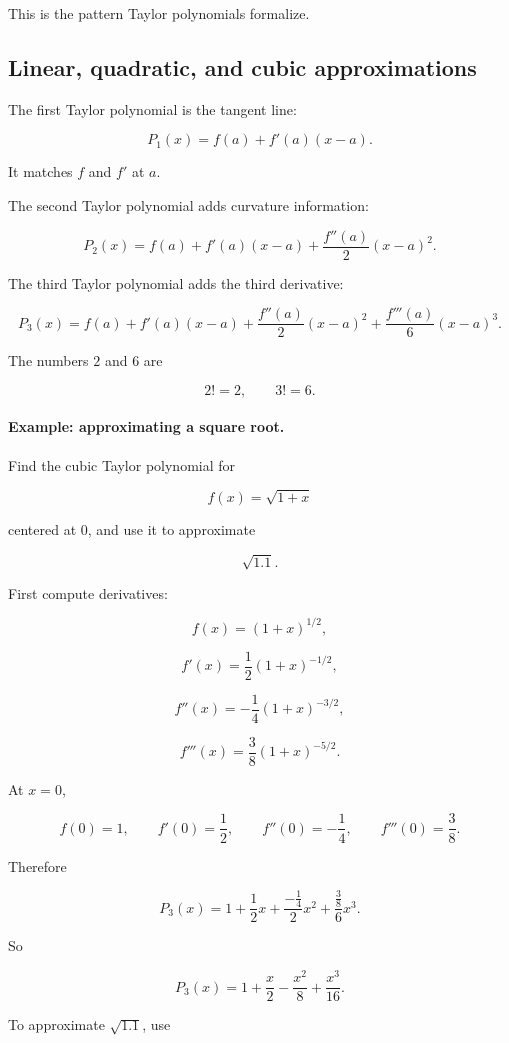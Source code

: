 This is the pattern Taylor polynomials formalize.

\subsection{Linear, quadratic, and cubic approximations}
\label{subsec:linear-quadratic-cubic-approximations}

The first Taylor polynomial is the tangent line:

\[
\boxed{
P_1(x)=f(a)+f'(a)(x-a).
}
\]

It matches \(f\) and \(f'\) at \(a\).

The second Taylor polynomial adds curvature information:

\[
\boxed{
P_2(x)
=
f(a)+f'(a)(x-a)+\frac{f''(a)}{2}(x-a)^2.
}
\]

The third Taylor polynomial adds the third derivative:

\[
\boxed{
P_3(x)
=
f(a)+f'(a)(x-a)
+\frac{f''(a)}{2}(x-a)^2
+\frac{f'''(a)}{6}(x-a)^3.
}
\]

The numbers \(2\) and \(6\) are

\[
2!=2,
\qquad
3!=6.
\]

\paragraph{Example: approximating a square root.}
Find the cubic Taylor polynomial for

\[
f(x)=\sqrt{1+x}
\]

centered at \(0\), and use it to approximate

\[
\sqrt{1.1}.
\]

First compute derivatives:

\[
f(x)=(1+x)^{1/2},
\]

\[
f'(x)=\frac12(1+x)^{-1/2},
\]

\[
f''(x)=-\frac14(1+x)^{-3/2},
\]

\[
f'''(x)=\frac38(1+x)^{-5/2}.
\]

At \(x=0\),

\[
f(0)=1,
\qquad
f'(0)=\frac12,
\qquad
f''(0)=-\frac14,
\qquad
f'''(0)=\frac38.
\]

Therefore

\[
P_3(x)
=
1+\frac12x+\frac{-\frac14}{2}x^2+\frac{\frac38}{6}x^3.
\]

So

\[
\boxed{
P_3(x)=1+\frac{x}{2}-\frac{x^2}{8}+\frac{x^3}{16}.
}
\]

To approximate \(\sqrt{1.1}\), use


